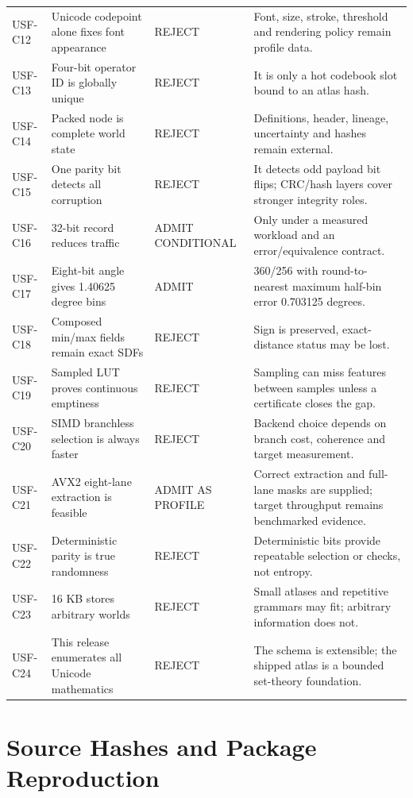 \documentclass[11pt,a4paper]{article}
\begin{document}
\begin{longtable}{P{14mm}P{42mm}P{27mm}P{72mm}}
USF-C12 & Unicode codepoint alone fixes font appearance & REJECT & Font, size, stroke, threshold and rendering policy remain profile data. \\
USF-C13 & Four-bit operator ID is globally unique & REJECT & It is only a hot codebook slot bound to an atlas hash. \\
USF-C14 & Packed node is complete world state & REJECT & Definitions, header, lineage, uncertainty and hashes remain external. \\
USF-C15 & One parity bit detects all corruption & REJECT & It detects odd payload bit flips; CRC/hash layers cover stronger integrity roles. \\
USF-C16 & 32-bit record reduces traffic & ADMIT CONDITIONAL & Only under a measured workload and an error/equivalence contract. \\
USF-C17 & Eight-bit angle gives 1.40625 degree bins & ADMIT & 360/256 with round-to-nearest maximum half-bin error 0.703125 degrees. \\
USF-C18 & Composed min/max fields remain exact SDFs & REJECT & Sign is preserved, exact-distance status may be lost. \\
USF-C19 & Sampled LUT proves continuous emptiness & REJECT & Sampling can miss features between samples unless a certificate closes the gap. \\
USF-C20 & SIMD branchless selection is always faster & REJECT & Backend choice depends on branch cost, coherence and target measurement. \\
USF-C21 & AVX2 eight-lane extraction is feasible & ADMIT AS PROFILE & Correct extraction and full-lane masks are supplied; target throughput remains benchmarked evidence. \\
USF-C22 & Deterministic parity is true randomness & REJECT & Deterministic bits provide repeatable selection or checks, not entropy. \\
USF-C23 & 16 KB stores arbitrary worlds & REJECT & Small atlases and repetitive grammars may fit; arbitrary information does not. \\
USF-C24 & This release enumerates all Unicode mathematics & REJECT & The schema is extensible; the shipped atlas is a bounded set-theory foundation. \\
\end{longtable}
\normalsize

\section{Source Hashes and Package Reproduction}
\end{document}
